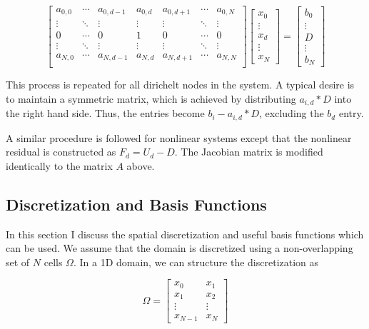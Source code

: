 \documentclass[11pt]{style/memo}
\begin{document}
\begin{equation*}
\begin{bmatrix}
a_{0,0} & \cdots & a_{0,d-1} & a_{0,d} & a_{0,d+1} & \cdots & a_{0,N} \\
\vdots  & \ddots & \vdots    & \vdots  & \vdots    & \ddots & \vdots  \\
0       & \cdots & 0         & 1       & 0         & \cdots & 0       \\
\vdots  & \ddots & \vdots    & \vdots  & \vdots    & \ddots & \vdots  \\
a_{N,0} & \cdots & a_{N,d-1} & a_{N,d} & a_{N,d+1} & \cdots & a_{N,N} \\
\end{bmatrix}
\begin{bmatrix}
    x_0 \\ \vdots \\ x_d \\ \vdots \\ x_N
\end{bmatrix} = 
\begin{bmatrix}
    b_0 \\ \vdots \\ D \\ \vdots \\ b_N
\end{bmatrix}
\end{equation*}

This process is repeated for all dirichelt nodes in the system. A typical desire is to maintain a
symmetric matrix, which is achieved by distributing $a_{i,d}*D$ into the right hand side. Thus, the
entries become $b_i - a_{i,d}*D$, excluding the $b_d$ entry.

\hspace{1em} A similar procedure is followed for nonlinear systems except that the nonlinear residual
is constructed as $F_d = U_d - D$. The Jacobian matrix is modified identically to the matrix $A$
above.

\subsection{Discretization and Basis Functions}\label{sec:basis}
In this section I discuss the spatial discretization and useful basis functions which can be used. We
assume that the domain is discretized using a non-overlapping set of $N$ cells $\Omega$. In a 1D
domain, we can structure the discretization as

\begin{equation*}
    \Omega = \begin{bmatrix}
        x_0 & x_1 \\
        x_1 & x_2 \\
        \vdots & \vdots \\
        x_{N-1} & x_N
    \end{bmatrix}
\end{equation*}
\end{document}
